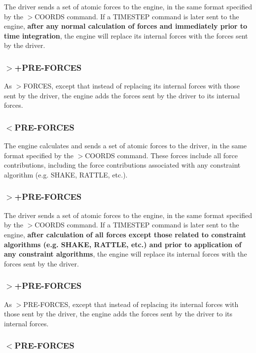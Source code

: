 The driver sends a set of atomic forces to the engine, in the same format specified by the {\ttfamily $>$C\-O\-O\-R\-D\-S} command. If a {\ttfamily T\-I\-M\-E\-S\-T\-E\-P} command is later sent to the engine, {\bfseries  after any normal calculation of forces and immediately prior to time integration}, the engine will replace its internal forces with the forces sent by the driver.\hypertarget{index_send_forces}{}\subsubsection{$>$+\-P\-R\-E-\/\-F\-O\-R\-C\-E\-S}\label{index_send_forces}
As {\ttfamily $>$F\-O\-R\-C\-E\-S}, except that instead of replacing its internal forces with those sent by the driver, the engine adds the forces sent by the driver to its internal forces.\hypertarget{index_recv_forces}{}\subsubsection{$<$\-P\-R\-E-\/\-F\-O\-R\-C\-E\-S}\label{index_recv_forces}
The engine calculates and sends a set of atomic forces to the driver, in the same format specified by the {\ttfamily $>$C\-O\-O\-R\-D\-S} command. These forces include all force contributions, including the force contributions associated with any constraint algorithm (e.\-g. S\-H\-A\-K\-E, R\-A\-T\-T\-L\-E, etc.).\hypertarget{index_send_forces}{}\subsubsection{$>$+\-P\-R\-E-\/\-F\-O\-R\-C\-E\-S}\label{index_send_forces}
The driver sends a set of atomic forces to the engine, in the same format specified by the {\ttfamily $>$C\-O\-O\-R\-D\-S} command. If a {\ttfamily T\-I\-M\-E\-S\-T\-E\-P} command is later sent to the engine, {\bfseries  after calculation of all forces except those related to constraint algorithms (e.\-g. S\-H\-A\-K\-E, R\-A\-T\-T\-L\-E, etc.) and prior to application of any constraint algorithms}, the engine will replace its internal forces with the forces sent by the driver.\hypertarget{index_send_forces}{}\subsubsection{$>$+\-P\-R\-E-\/\-F\-O\-R\-C\-E\-S}\label{index_send_forces}
As {\ttfamily $>$P\-R\-E-\/\-F\-O\-R\-C\-E\-S}, except that instead of replacing its internal forces with those sent by the driver, the engine adds the forces sent by the driver to its internal forces.\hypertarget{index_recv_forces}{}\subsubsection{$<$\-P\-R\-E-\/\-F\-O\-R\-C\-E\-S}\label{index_recv_forces}
